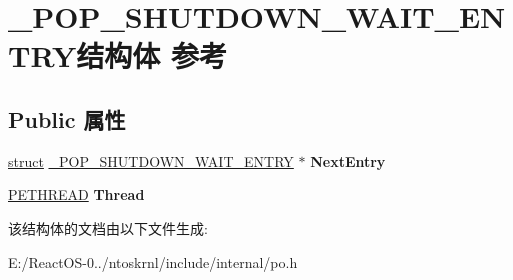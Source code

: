 \hypertarget{struct___p_o_p___s_h_u_t_d_o_w_n___w_a_i_t___e_n_t_r_y}{}\section{\+\_\+\+P\+O\+P\+\_\+\+S\+H\+U\+T\+D\+O\+W\+N\+\_\+\+W\+A\+I\+T\+\_\+\+E\+N\+T\+R\+Y结构体 参考}
\label{struct___p_o_p___s_h_u_t_d_o_w_n___w_a_i_t___e_n_t_r_y}
\subsection*{Public 属性}
\begin{DoxyCompactItemize}
\item 
\mbox{\label{struct___p_o_p___s_h_u_t_d_o_w_n___w_a_i_t___e_n_t_r_y_ace0f9e53278f0dd1f91317946b22fbe7}} 
\hyperlink{interfacestruct}{struct} \hyperlink{struct___p_o_p___s_h_u_t_d_o_w_n___w_a_i_t___e_n_t_r_y}{\+\_\+\+P\+O\+P\+\_\+\+S\+H\+U\+T\+D\+O\+W\+N\+\_\+\+W\+A\+I\+T\+\_\+\+E\+N\+T\+RY} $\ast$ {\bfseries Next\+Entry}
\item 
\mbox{\label{struct___p_o_p___s_h_u_t_d_o_w_n___w_a_i_t___e_n_t_r_y_af2b4f1ae3ae774761141b99881c3239f}} 
\hyperlink{struct___e_t_h_r_e_a_d}{P\+E\+T\+H\+R\+E\+AD} {\bfseries Thread}
\end{DoxyCompactItemize}


该结构体的文档由以下文件生成\+:\begin{DoxyCompactItemize}
\item 
E\+:/\+React\+O\+S-\/0../ntoskrnl/include/internal/po.\+h\end{DoxyCompactItemize}
